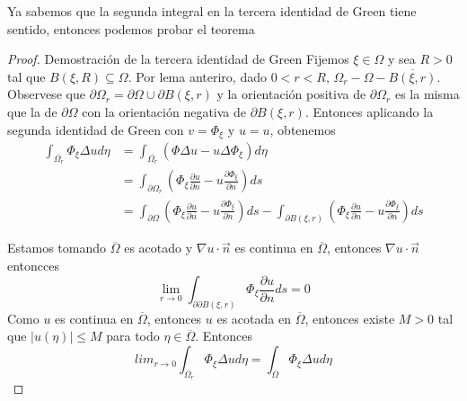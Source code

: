 \documentclass[11pt]{book}
\theoremstyle{plain}
\theoremstyle{definition}
\begin{document}
    Ya sabemos que la segunda integral en la tercera identidad de Green tiene sentido, entonces podemos probar el teorema
    \begin{proof}{Demostración de la tercera identidad de Green}
        Fijemos $\xi \in \Omega$ y sea $R > 0$ tal que $B(\xi, R)\subseteq \Omega$. Por lema anteriro, dado $0 < r < R$, $\Omega_{r} - \Omega - \overline{B(\xi, r)}$. Observese que $\partial \Omega_{r} = \partial \Omega \cup \partial B(\xi, r)$ y la orientación positiva de $\partial \Omega_{r}$ es la misma que la de $\partial \Omega$ con la orientación negativa de $\partial B(\xi, r)$. Entonces aplicando la segunda identidad de Green con $v = \Phi_{\xi}$ y $u = u$, obtenemos
        \begin{align*}
            \int_{\overline{\Omega_{r}}} \Phi_{\xi} \Delta u d\eta &= \int_{\overline{\Omega_{r}}} \left( \Phi \Delta u - u \Delta \Phi_{\xi}\right) d\eta\\
            &= \int_{\partial \Omega_{r}} \left( \Phi_{\xi} \frac{\partial u}{\partial n} - u \frac{\partial \Phi_{\xi}}{\partial n}\right) ds\\
            & = \int_{\partial \Omega} \left( \Phi_{\xi} \frac{\partial u}{\partial n} - u \frac{\partial \Phi_{\xi}}{\partial n}\right) ds - \int_{\partial B(\xi, r)} \left( \Phi_{\xi} \frac{\partial u}{\partial n} - u \frac{\partial \Phi_{\xi}}{\partial n}\right) ds
        \end{align*}
        
        Estamos tomando $\overline{\Omega}$ es acotado y $\nabla u \cdot \overrightarrow{n}$ es continua en $\overline{\Omega}$, entonces $\nabla u \cdot \overrightarrow{n}$ entoncces
        \[
            \lim_{r \to 0} \int_{\partial \partial B(\xi, r)} \Phi_{\xi} \frac{\partial u}{\partial n} ds = 0
        \]
        Como $u$ es continua en $\overline{\Omega}$, entonces $u$ es acotada en $\overline{\Omega}$, entonces existe $M > 0$ tal que $|u(\eta)| \leq M$ para todo $\eta \in \overline{\Omega}$. Entonces
        \[
            lim_{r \to 0} \int_{\overline{\Omega_{r}}} \Phi_{\xi} \Delta u d\eta = \int_{\overline{\Omega}} \Phi_{\xi} \Delta u d\eta
        \]
    \end{proof}
\end{document}
